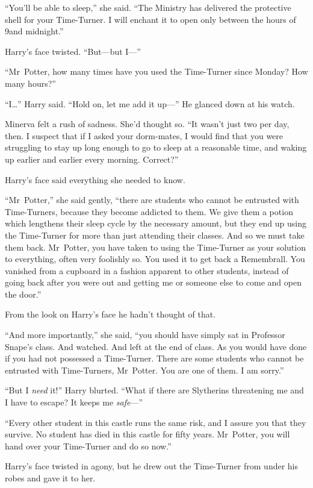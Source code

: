 “You’ll be able to sleep,” she said. “The Ministry has delivered the protective shell for your Time-Turner. I will enchant it to open only between the hours of 9\pm and midnight.”

Harry’s face twisted. “But—but I—”

“Mr~Potter, how many times have you used the Time-Turner since Monday? How many hours?”

“I…” Harry said. “Hold on, let me add it up—” He glanced down at his watch.

Minerva felt a rush of sadness. She’d thought so. “It wasn’t just two per day, then. I suspect that if I asked your dorm-mates, I would find that you were struggling to stay up long enough to go to sleep at a reasonable time, and waking up earlier and earlier every morning. Correct?”

Harry’s face said everything she needed to know.

“Mr~Potter,” she said gently, “there are students who cannot be entrusted with Time-Turners, because they become addicted to them. We give them a potion which lengthens their sleep cycle by the necessary amount, but they end up using the Time-Turner for more than just attending their classes. And so we must take them back. Mr~Potter, you have taken to using the Time-Turner as your solution to everything, often very foolishly so. You used it to get back a Remembrall. You vanished from a cupboard in a fashion apparent to other students, instead of going back after you were out and getting me or someone else to come and open the door.”

From the look on Harry’s face he hadn’t thought of that.

“And more importantly,” she said, “you should have simply sat in Professor Snape’s class. And watched. And left at the end of class. As you would have done if you had not possessed a Time-Turner. There are some students who cannot be entrusted with Time-Turners, Mr~Potter. You are one of them. I am sorry.”

“But I \emph{need} it!” Harry blurted. “What if there are Slytherins threatening me and I have to escape? It keeps me \emph{safe}—”

“Every other student in this castle runs the same risk, and I assure you that they survive. No student has died in this castle for fifty years. Mr~Potter, you will hand over your Time-Turner and do so now.”

Harry’s face twisted in agony, but he drew out the Time-Turner from under his robes and gave it to her.

